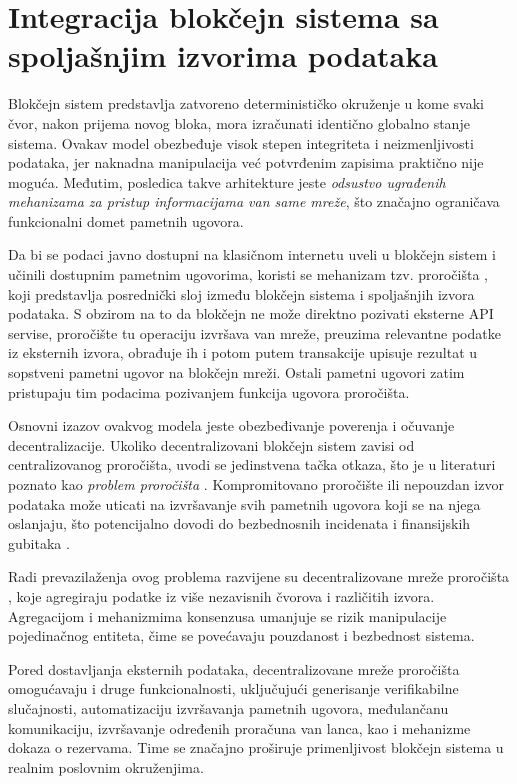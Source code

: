 \section{Integracija blokčejn sistema sa spoljašnjim izvorima podataka}
Blokčejn sistem predstavlja zatvoreno determinističko okruženje u kome svaki čvor, nakon prijema novog bloka, mora izračunati identično globalno stanje sistema. Ovakav model obezbeđuje visok stepen integriteta i neizmenljivosti podataka, jer naknadna manipulacija već potvrđenim zapisima praktično nije moguća. Međutim, posledica takve arhitekture jeste \textit{odsustvo ugrađenih mehanizama za pristup informacijama van same mreže}, što značajno ograničava funkcionalni domet pametnih ugovora.

Da bi se podaci javno dostupni na klasičnom internetu uveli u blokčejn sistem i učinili dostupnim pametnim ugovorima, koristi se mehanizam tzv. proročišta \cite{beniiche2020study} , koji predstavlja posrednički sloj između blokčejn sistema i spoljašnjih izvora podataka. S obzirom na to da blokčejn ne može direktno pozivati eksterne API servise, proročište tu operaciju izvršava van mreže, preuzima relevantne podatke iz eksternih izvora, obrađuje ih i potom putem transakcije upisuje rezultat u sopstveni pametni ugovor na blokčejn mreži. Ostali pametni ugovori zatim pristupaju tim podacima pozivanjem funkcija ugovora proročišta.

Osnovni izazov ovakvog modela jeste obezbeđivanje poverenja i očuvanje decentralizacije. Ukoliko decentralizovani blokčejn sistem zavisi od centralizovanog proročišta, uvodi se jedinstvena tačka otkaza, što je u literaturi poznato kao \textit{problem proročišta} . Kompromitovano proročište ili nepouzdan izvor podataka može uticati na izvršavanje svih pametnih ugovora koji se na njega oslanjaju, što potencijalno dovodi do bezbednosnih incidenata i finansijskih gubitaka \cite{arora2024secplf}.

Radi prevazilaženja ovog problema razvijene su decentralizovane mreže proročišta \cite{breidenbach2021chainlink} , koje agregiraju podatke iz više nezavisnih čvorova i različitih izvora. Agregacijom i mehanizmima konsenzusa umanjuje se rizik manipulacije pojedinačnog entiteta, čime se povećavaju pouzdanost i bezbednost sistema.

Pored dostavljanja eksternih podataka, decentralizovane mreže proročišta omogućavaju i druge funkcionalnosti, uključujući generisanje verifikabilne slučajnosti, automatizaciju izvršavanja pametnih ugovora, međulančanu komunikaciju, izvršavanje određenih proračuna van lanca, kao i mehanizme dokaza o rezervama. Time se značajno proširuje primenljivost blokčejn sistema u realnim poslovnim okruženjima.

